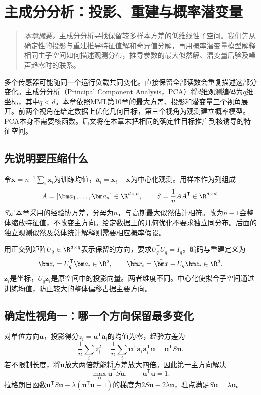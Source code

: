 \chapter{主成分分析：投影、重建与概率潜变量}
\label{chap:pca}
\begin{quote}\small
\textit{本章摘要。}主成分分析寻找保留较多样本方差的低维线性子空间。我们先从确定性的投影与重建推导特征值解和奇异值分解，再用概率潜变量模型解释相同主子空间如何描述观测分布，推导参数的最大似然解、潜变量后验及噪声趋零时的联系。
\end{quote}

多个传感器可能随同一个运行负载共同变化。直接保留全部读数会重复描述这部分变化。主成分分析（Principal Component Analysis，PCA）将$d$维观测编码为$q$维坐标，其中$q<d$。本章依照MML第10章的最大方差、投影和潜变量三个视角展开\cite{deisenroth2020mml}。前两个视角在给定数据上优化几何目标，第三个视角为观测建立概率模型。PCA本身不需要核函数。后文将在本章末把相同的确定性目标推广到核诱导的特征空间。

\section{先说明要压缩什么}
令$\bar{\bm x}=n^{-1}\sum_i\bm x_i$为训练均值，$\bm a_i=\bm x_i-\bar{\bm x}$为中心化观测。用样本作为列组成
\begin{equation}
 A=[\bm a_1,\ldots,\bm a_n]\in\R^{d\times n},\qquad
 S=\frac1n AA^{\mathsf T}\in\R^{d\times d}.
 \label{eq:pca-data-covariance}
\end{equation}
$S$是本章采用的经验协方差，分母为$n$，与高斯最大似然估计相符。改为$n-1$会整体缩放特征值，不改变主方向。给定数据上的几何优化不要求独立同分布。后面的独立观测似然及总体统计解释则需要相应概率假设。

用正交列矩阵$U_q\in\R^{d\times q}$表示保留的方向，要求$U_q^{\mathsf T}U_q=I_q$。编码与重建定义为
\begin{equation}
 \bm z_i=U_q^{\mathsf T}\bm a_i\in\R^q,\qquad
 \hat{\bm x}_i=\bar{\bm x}+U_q\bm z_i\in\R^d.
 \label{eq:pca-encode-decode}
\end{equation}
$\bm z_i$是坐标，$U_q\bm z_i$是原空间中的投影向量。两者维度不同。中心化使拟合子空间通过训练均值，防止较大的整体偏移占据主要方向。

\section{确定性视角一：哪一个方向保留最多变化}
对单位方向$\bm u$，投影得分$z_i=\bm u^{\mathsf T}\bm a_i$的均值为零，经验方差为
\begin{equation}
 \frac1n\sum_i z_i^2
 =\frac1n\sum_i\bm u^{\mathsf T}\bm a_i\bm a_i^{\mathsf T}\bm u
 =\bm u^{\mathsf T}S\bm u.
\end{equation}
若不限制长度，将$\bm u$放大两倍就能将方差放大四倍。因此第一主方向解决
\begin{equation}
 \max_{\bm u}\bm u^{\mathsf T}S\bm u,
 \qquad\bm u^{\mathsf T}\bm u=1.
 \label{eq:pca-rayleigh}
\end{equation}
拉格朗日函数$\bm u^{\mathsf T}S\bm u-\lambda(\bm u^{\mathsf T}\bm u-1)$的梯度为$2S\bm u-2\lambda\bm u$，驻点满足$S\bm u=\lambda\bm u$。

